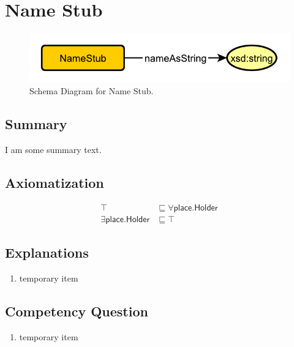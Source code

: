\section{Name Stub}
\label{sec:Name}
\begin{figure}[h!]
\begin{center}
\includegraphics[width=.4\textwidth]{figures/name}
\end{center}
\caption{Schema Diagram for Name Stub.}
\label{fig:Name}
\end{figure}
\subsection{Summary}
\label{sum:Name}
I am some summary text.

\subsection{Axiomatization}
\label{axs:Name}
\begin{align}
\top &\sqsubseteq \forall\textsf{place.Holder} \\ 
\exists\textsf{place.Holder} &\sqsubseteq \top 
\end{align}

\subsection{Explanations}
\label{exp:Name}
\begin{enumerate}
\item temporary item
\end{enumerate}

\subsection{Competency Question}
\label{cqs:Name}
\begin{enumerate}[CQ1.]
\item temporary item
\end{enumerate}

\newpage
